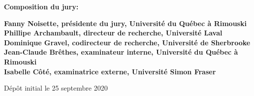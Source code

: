 \thispagestyle{empty}

\null
\vfill
\noindent \textbf{Composition du jury:}\\
\vspace{1cm}

\begin{singlespace}
  \noindent \textbf{Fanny Noisette, présidente du jury, Université du Québec à Rimouski}\\

  \noindent \textbf{Phillipe Archambault, directeur de recherche, Université Laval}\\

  \noindent \textbf{Dominique Gravel, codirecteur de recherche, Université de Sherbrooke}\\

  \noindent \textbf{Jean-Claude Brêthes, examinateur interne, Université du Québec à Rimouski}\\

  \noindent \textbf{Isabelle Côté, examinatrice externe, Université Simon Fraser}\\
\end{singlespace}

\vspace{2cm}
\noindent Dépôt initial le 25 septembre 2020
\hspace{3cm}


\cleardoublepage
